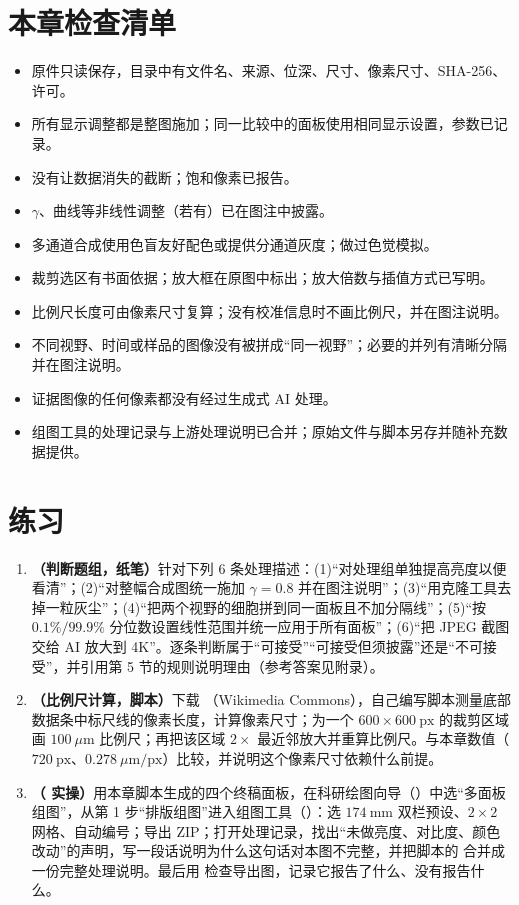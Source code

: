 \section{本章检查清单}

\begin{itemize}
\item 原件只读保存，目录中有文件名、来源、位深、尺寸、像素尺寸、SHA-256、许可。
\item 所有显示调整都是整图施加；同一比较中的面板使用相同显示设置，参数已记录。
\item 没有让数据消失的截断；饱和像素已报告。
\item $\gamma$、曲线等非线性调整（若有）已在图注中披露。
\item 多通道合成使用色盲友好配色或提供分通道灰度；做过色觉模拟。
\item 裁剪选区有书面依据；放大框在原图中标出；放大倍数与插值方式已写明。
\item 比例尺长度可由像素尺寸复算；没有校准信息时不画比例尺，并在图注说明。
\item 不同视野、时间或样品的图像没有被拼成“同一视野”；必要的并列有清晰分隔并在图注说明。
\item 证据图像的任何像素都没有经过生成式 AI 处理。
\item 组图工具的处理记录与上游处理说明已合并；原始文件与脚本另存并随补充数据提供。
\end{itemize}

\section{练习}

\begin{enumerate}
\item \textbf{（判断题组，纸笔）}针对下列 6 条处理描述：(1)“对处理组单独提高亮度以便看清”；(2)“对整幅合成图统一施加 $\gamma = 0.8$ 并在图注说明”；(3)“用克隆工具去掉一粒灰尘”；(4)“把两个视野的细胞拼到同一面板且不加分隔线”；(5)“按 $0.1\%/99.9\%$ 分位数设置线性范围并统一应用于所有面板”；(6)“把 JPEG 截图交给 AI 放大到 4K”。逐条判断属于“可接受”“可接受但须披露”还是“不可接受”，并引用第 5 节的规则说明理由（参考答案见附录）。
\item \textbf{（比例尺计算，脚本）}下载 （Wikimedia Commons），自己编写脚本测量底部数据条中标尺线的像素长度，计算像素尺寸；为一个 $600 \times 600\ \text{px}$ 的裁剪区域画 $100\ \mu\text{m}$ 比例尺；再把该区域 $2\times$ 最近邻放大并重算比例尺。与本章数值（$720\ \text{px}$、$0.278\ \mu\text{m/px}$）比较，并说明这个像素尺寸依赖什么前提。
\item \textbf{（\scidraw{} 实操）}用本章脚本生成的四个终稿面板，在科研绘图向导（）中选“多面板组图”，从第 1 步“排版组图”进入组图工具（）：选 $174\ \text{mm}$ 双栏预设、$2 \times 2$ 网格、自动编号；导出 ZIP；打开处理记录，找出“未做亮度、对比度、颜色改动”的声明，写一段话说明为什么这句话对本图不完整，并把脚本的  合并成一份完整处理说明。最后用  检查导出图，记录它报告了什么、没有报告什么。
\end{enumerate}


